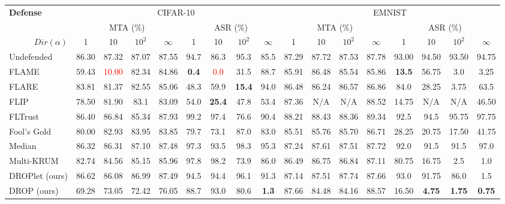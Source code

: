 \begin{table*}[th]
    \centering
    \begin{tabular}{l|cccc|cccc|cccc|cccc}
    \toprule
    \multirow{2}{*}{\textbf{Defense}} & \multicolumn{8}{c}{CIFAR-10} & \multicolumn{8}{c}{EMNIST} \\
     & \multicolumn{4}{c}{MTA (\%)} & \multicolumn{4}{c}{ASR (\%)} & \multicolumn{4}{c}{MTA (\%)} & \multicolumn{4}{c}{ASR (\%)} \\
     \cline{2-17}
     \multicolumn{1}{r|}{$Dir(\alpha)$} & 1 & 10 & $10^2$ & $\infty$ & 1 & 10 & $10^2$ & $\infty$ & 1 & 10 & $10^2$ & $\infty$ & 1 & 10 & $10^2$ & $\infty$ \\
    \midrule
    Undefended & 86.30 & 87.32 & 87.07 & 87.55 & 94.7 & 86.3 & 95.3 & 85.5 & 87.29 & 87.72 & 87.53 & 87.78 & 93.00 & 94.50 & 93.50 & 94.75  \\
    \hline
    FLAME & 59.43 & \textcolor{red}{10.00} & 82.34 & 84.86 & \textbf{0.4} & \textcolor{red}{0.0} & 31.5 & 88.7 & 85.91 & 86.48 & 85.54 & 85.86 & \textbf{13.5} & 56.75 & 3.0 & 3.25  \\
    FLARE & 83.81 & 81.37 & 82.55 & 85.06 & 48.3 & 59.9 & \textbf{15.4} & 94.0 & 86.48 & 86.24 & 86.57 & 86.86 & 84.0 & 28.25 & 3.75 & 63.5 \\
    FLIP & 78.50 & 81.90 & 83.1 & 83.09 & 54.0 & \textbf{25.4} & 47.8 & 53.4 & 87.36 & N/A & N/A & 88.52 & 14.75 & N/A & N/A & 46.50 \\
    FLTrust & 86.40 & 86.84 & 85.34 & 87.93 & 99.2 & 97.4 & 76.6 & 90.4 & 88.21 & 88.43 & 88.36 & 89.34 & 92.5 & 94.5 & 95.75 & 97.75 \\
    Fool's Gold & 80.00 & 82.93 & 83.95 & 83.85 & 79.7 & 73.1 & 87.0 & 83.0 & 85.51 & 85.76 & 85.70 & 86.71 & 28.25 & 20.75 & 17.50 & 41.75 \\
    Median & 86.32 & 86.31 & 87.10 & 87.48 & 97.3 & 93.5 & 98.3 & 95.3 & 87.24 & 87.61 & 87.51 & 87.72 & 92.0 & 91.5 & 91.5 & 97.0 \\
    Multi-KRUM & 82.74 & 84.56 & 85.15 & 85.96 & 97.8 & 98.2 & 73.9 & 86.0 & 86.49 & 86.75 & 86.84 & 87.11 & 80.75 & 16.75 & 2.5 & 1.0 \\
    \hline
    DROPlet (ours) & 86.62 & 86.08 & 86.99 & 87.49 & 94.5 & 94.4 & 96.1 & 91.3 & 87.14 & 87.51 & 87.74 & 87.66 & 93.0 & 91.75 & 86.0 & 1.5 \\
    DROP (ours) & 69.28 & 73.05 & 72.42 & 76.05 & 88.7 & 93.0 & 80.6 & \textbf{1.3} & 87.66 & 84.48 & 84.16 & 88.57 & 16.50 & \textbf{4.75} & \textbf{1.75} & \textbf{0.75} \\

\end{tabular}
\end{table*}
